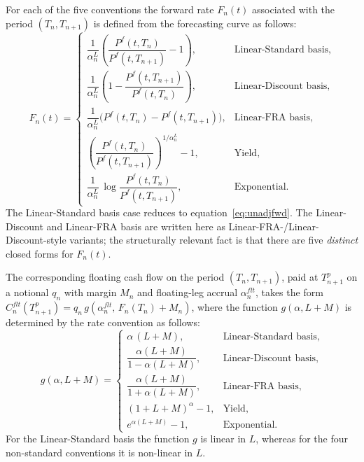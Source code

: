 \documentclass[]{pmv_report} %
\begin{document}
For each of the five conventions the forward rate $F_n(t)$ associated with the period $(T_n,T_{n+1})$ is defined from the forecasting curve as follows:
\begin{equation}
\label{eq:fwd-rate-conventions}
F_n(t) = \begin{cases}
\dfrac{1}{\alpha_n^L}\left(\dfrac{P^f(t,T_n)}{P^f(t,T_{n+1})}-1\right), & \text{Linear-Standard basis}, \\[1.2em]
\dfrac{1}{\alpha_n^L}\left(1-\dfrac{P^f(t,T_{n+1})}{P^f(t,T_n)}\right), & \text{Linear-Discount basis}, \\[1.2em]
\dfrac{1}{\alpha_n^L}\bigl(P^f(t,T_n)-P^f(t,T_{n+1})\bigr), & \text{Linear-FRA basis}, \\[1.2em]
\left(\dfrac{P^f(t,T_n)}{P^f(t,T_{n+1})}\right)^{1/\alpha_n^L}-1, & \text{Yield}, \\[1.2em]
\dfrac{1}{\alpha_n^L}\,\log\dfrac{P^f(t,T_n)}{P^f(t,T_{n+1})}, & \text{Exponential}.
\end{cases}
\end{equation}
The Linear-Standard basis case reduces to equation~\eqref{eq:unadjfwd}.
The Linear-Discount and Linear-FRA basis are written here as Linear-FRA-/Linear-Discount-style variants; the structurally relevant fact is that there are five \emph{distinct} closed forms for $F_n(t)$.

The corresponding floating cash flow on the period $(T_n,T_{n+1})$, paid at $T_{n+1}^p$ on a notional $q_n$ with margin $M_n$ and floating-leg accrual $\alpha_n^{flt}$, takes the form $C_n^{flt}(T_{n+1}^p) = q_n\,g\!\left(\alpha_n^{flt},\,F_n(T_n)+M_n\right)$, where the function $g(\alpha,L+M)$ is determined by the rate convention as follows:
\begin{equation}
\label{eq:g-rate-conventions}
g(\alpha,L+M) = \begin{cases}
\alpha\,(L+M), & \text{Linear-Standard basis}, \\[0.6em]
\dfrac{\alpha(L+M)}{1-\alpha(L+M)}, & \text{Linear-Discount basis}, \\[0.9em]
\dfrac{\alpha(L+M)}{1+\alpha(L+M)}, & \text{Linear-FRA basis}, \\[0.9em]
(1+L+M)^{\alpha}-1, & \text{Yield}, \\[0.6em]
e^{\alpha(L+M)}-1, & \text{Exponential}.
\end{cases}
\end{equation}
For the Linear-Standard basis the function $g$ is linear in $L$, whereas for the four non-standard conventions it is non-linear in $L$.
\end{document}
